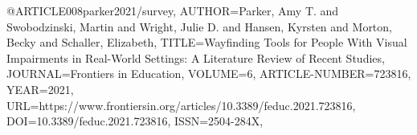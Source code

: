 @ARTICLE{008parker2021/survey,
AUTHOR={Parker, Amy T. and Swobodzinski, Martin and Wright, Julie D. and Hansen, Kyrsten and Morton, Becky and Schaller, Elizabeth},   
TITLE={Wayfinding Tools for People With Visual Impairments in Real-World Settings: A Literature Review of Recent Studies},      
JOURNAL={Frontiers in Education},      
VOLUME={6},
ARTICLE-NUMBER={723816},
YEAR={2021},      
URL={https://www.frontiersin.org/articles/10.3389/feduc.2021.723816},       
DOI={10.3389/feduc.2021.723816},      
ISSN={2504-284X},   
}